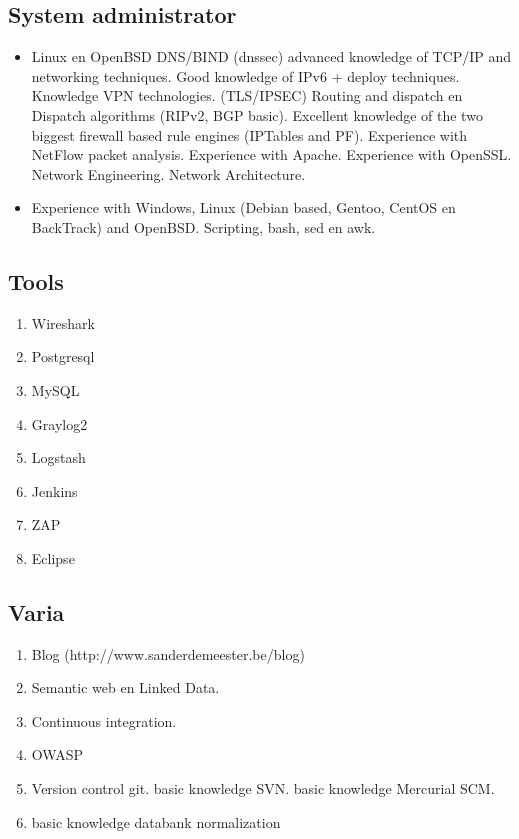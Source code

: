 \documentclass[margin, 10pt]{res} %
\begin{document}
\subsection{System administrator}
\begin{itemize}
\item Linux en OpenBSD
\subitem DNS/BIND (dnssec)
\subitem advanced knowledge of TCP/IP and networking techniques.
\subitem Good knowledge of IPv6 + deploy techniques.
\subitem Knowledge VPN technologies. (TLS/IPSEC)
\subitem Routing and dispatch en Dispatch algorithms (RIPv2, BGP basic).
\subitem Excellent knowledge of the two biggest firewall based rule engines (IPTables and PF).
\subitem Experience with NetFlow packet analysis.
\subitem Experience with Apache.
\subitem Experience with OpenSSL.
\subitem Network Engineering.
\subitem Network Architecture.
\item Experience with Windows, Linux (Debian based, Gentoo, CentOS en BackTrack) and OpenBSD.
\subitem Scripting, bash, sed en awk.
\end{itemize}
\begin{multicols}{2}
\subsection*{Tools}
\begin{enumerate}
\item[] Wireshark
\item[] Postgresql
\item[] MySQL
\item[] Graylog2
\item[] Logstash
\item[] Jenkins
\item[] ZAP
\item[] Eclipse
\end{enumerate}
\subsection{Varia}
\begin{enumerate}
\item[] Blog (http://www.sanderdemeester.be/blog)
\item[] Semantic web en Linked Data.
\item[] Continuous integration.
\item[] OWASP
\item[] Version control
\subitem git.
\subitem basic knowledge SVN.
\subitem basic knowledge Mercurial SCM.
\item[] basic knowledge databank normalization
\end{enumerate}
\end{multicols}
\end{document}
